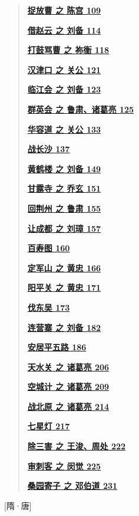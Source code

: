 \begin{quote}
\href{/l}{\textbf{捉放曹 之 陈宫 109}}

\href{/l}{\textbf{借赵云 之 刘备 114}}

\href{/l}{\textbf{打鼓骂曹 之 祢衡 118}}

\href{/l}{\textbf{汉津口 之 关公 121}}

\href{/l}{\textbf{临江会 之 刘备 123}}

\href{/l}{\textbf{群英会 之 鲁肃、诸葛亮 125}}

\href{/l}{\textbf{华容道 之 关公 133}}

\href{/l}{\textbf{战长沙 137}}

\href{/l}{\textbf{黄鹤楼 之 刘备 149}}

\href{/l}{\textbf{甘露寺 之 乔玄 151}}

\href{/l}{\textbf{回荆州 之 鲁肃 155}}

\href{/l}{\textbf{让成都 之 刘璋 157}}

\href{/l}{\textbf{百寿图 160}}

\href{/l}{\textbf{定军山 之 黄忠 166}}

\href{/l}{\textbf{阳平关 之 黄忠 171}}

\href{/l}{\textbf{伐东吴 173}}

\href{/l}{\textbf{连营寨 之 刘备 182}}

\href{/l}{\textbf{安居平五路 186}}

\href{/l}{\textbf{天水关 之 诸葛亮 206}}

\href{/l}{\textbf{空城计 之 诸葛亮 209}}

\href{/l}{\textbf{战北原 之 诸葛亮 214}}

\href{/l}{\textbf{七星灯 217}}

\href{/l}{\textbf{除三害 之 王浚、周处 222}}

\href{/l}{\textbf{审刺客 之 闵觉 225}}

\href{/l}{\textbf{桑园寄子 之 邓伯道 231}}
\end{quote}

{[}隋·唐{]}

